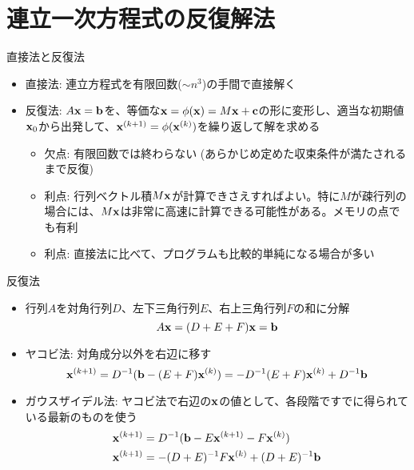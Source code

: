 \section{連立一次方程式の反復解法}

\begin{frame}[t,fragile]{直接法と反復法}
  \begin{itemize}
    \setlength{\itemsep}{1em}
  \item 直接法: 連立方程式を有限回数($\sim n^3$)の手間で直接解く
  \item 反復法: $A{\bf x}={\bf b}$を、等価な${\bf x} = \phi({\bf x}) = M{\bf x} + {\bf c}$の形に変形し、適当な初期値${\bf x}_0$から出発して、${\bf x}^{(k+1)} = \phi({\bf x}^{(k)})$を繰り返して解を求める
    \begin{itemize}
    \item 欠点: 有限回数では終わらない (あらかじめ定めた収束条件が満たされるまで反復)
    \item 利点: 行列ベクトル積$M{\bf x}$が計算できさえすればよい。特に$M$が疎行列の場合には、$M{\bf x}$は非常に高速に計算できる可能性がある。メモリの点でも有利
    \item 利点: 直接法に比べて、プログラムも比較的単純になる場合が多い
    \end{itemize}
  \end{itemize}
\end{frame}

\begin{frame}[t,fragile]{反復法}
  \begin{itemize}
    \setlength{\itemsep}{1em}
  \item 行列$A$を対角行列$D$、左下三角行列$E$、右上三角行列$F$の和に分解
    \[
    A{\bf x} = (D + E + F){\bf x} = {\bf b}
    \]
  \item ヤコビ法: 対角成分以外を右辺に移す
    \[
      {\bf x}^{(k+1)} = D^{-1} ({\bf b} - (E+F) {\bf x}^{(k)}) = -D^{-1}(E+F){\bf x}^{(k)} + D^{-1} {\bf b}
      \]
    \item ガウスザイデル法: ヤコビ法で右辺の${\bf x}$の値として、各段階ですでに得られている最新のものを使う
    \begin{align*}
      {\bf x}^{(k+1)} &= D^{-1} ({\bf b} - E{\bf x}^{(k+1)} - F{\bf x}^{(k)}) \\
      {\bf x}^{(k+1)} &= -(D+E)^{-1} F{\bf x}^{(k)} + (D+E)^{-1}{\bf b}
    \end{align*}
  \end{itemize}
\end{frame}

